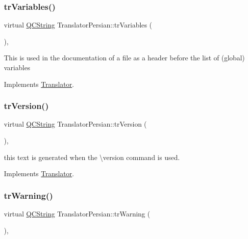 \mbox{\label{class_translator_persian_a4e336f7f7ddb0c3825acca38af8f88f8}} 
\subsubsection{\texorpdfstring{trVariables()}{trVariables()}}
{\footnotesize\ttfamily virtual \mbox{\hyperlink{class_q_c_string}{Q\+C\+String}} Translator\+Persian\+::tr\+Variables (\begin{DoxyParamCaption}{ }\end{DoxyParamCaption})\hspace{0.3cm}{\ttfamily [inline]}, {\ttfamily [virtual]}}

This is used in the documentation of a file as a header before the list of (global) variables 

Implements \mbox{\hyperlink{class_translator}{Translator}}.

\mbox{\label{class_translator_persian_ac895454bf86458bd4d67ecf413640db4}} 
\subsubsection{\texorpdfstring{trVersion()}{trVersion()}}
{\footnotesize\ttfamily virtual \mbox{\hyperlink{class_q_c_string}{Q\+C\+String}} Translator\+Persian\+::tr\+Version (\begin{DoxyParamCaption}{ }\end{DoxyParamCaption})\hspace{0.3cm}{\ttfamily [inline]}, {\ttfamily [virtual]}}

this text is generated when the \textbackslash{}version command is used. 

Implements \mbox{\hyperlink{class_translator}{Translator}}.

\mbox{\label{class_translator_persian_a11882019f58b798098757cd6d5b7a06b}} 
\subsubsection{\texorpdfstring{trWarning()}{trWarning()}}
{\footnotesize\ttfamily virtual \mbox{\hyperlink{class_q_c_string}{Q\+C\+String}} Translator\+Persian\+::tr\+Warning (\begin{DoxyParamCaption}{ }\end{DoxyParamCaption})\hspace{0.3cm}{\ttfamily [inline]}, {\ttfamily [virtual]}}

